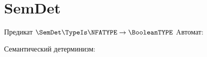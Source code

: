 \section{SemDet}
\begin{frame}{Предикат $\SemDet\TypeIs\NFATYPE\to\BooleanTYPE$}
    \vspace{-5pt}
	Aвтомат:




    Семантический детерминизм:



\end{frame}
